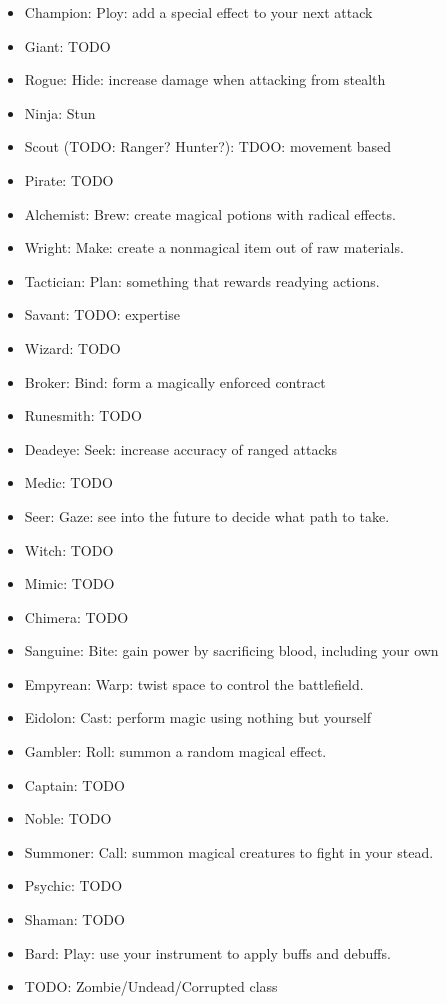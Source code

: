 \documentclass[12pt]{article}
\begin{document}
\begin{itemize}
\item Champion: Ploy: add a special effect to your next attack
\item Giant: TODO
\item Rogue: Hide: increase damage when attacking from stealth
\item Ninja: Stun
\item Scout (TODO: Ranger? Hunter?): TDOO: movement based
\item Pirate: TODO
\item Alchemist: Brew: create magical potions with radical effects.
\item Wright: Make: create a nonmagical item out of raw materials.
\item Tactician: Plan: something that rewards readying actions.
\item Savant: TODO: expertise
\item Wizard: TODO
\item Broker: Bind: form a magically enforced contract
\item Runesmith: TODO
\item Deadeye: Seek: increase accuracy of ranged attacks
\item Medic: TODO
\item Seer: Gaze: see into the future to decide what path to take.
\item Witch: TODO
\item Mimic: TODO
\item Chimera: TODO
\item Sanguine: Bite: gain power by sacrificing blood, including your own
\item Empyrean: Warp: twist space to control the battlefield.
\item Eidolon: Cast: perform magic using nothing but yourself
\item Gambler: Roll: summon a random magical effect.
\item Captain: TODO
\item Noble: TODO
\item Summoner: Call: summon magical creatures to fight in your stead.
\item Psychic: TODO
\item Shaman: TODO
\item Bard: Play: use your instrument to apply buffs and debuffs.
\item TODO: Zombie/Undead/Corrupted class
\end{itemize}
\end{document}
